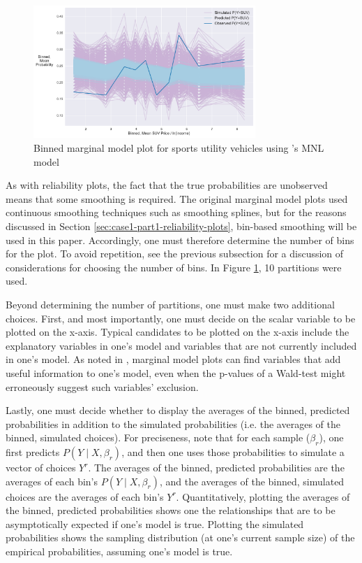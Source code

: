 \documentclass[preprint]{elsarticle}
\begin{document}
\begin{figure}
\centering
\includegraphics[width=0.75\textwidth]{marginal-model-plot-vehicle-choice-mnl-suv}
\caption{Binned marginal model plot for sports utility vehicles using \citeauthor{brownstone_forecasting_1998}'s MNL model}
\label{fig:orig-mnl-suv-marginal}
\end{figure}

As with reliability plots, the fact that the true probabilities are unobserved means that some smoothing is required. The original marginal model plots \citep{pardoe_2002_graphical} used continuous smoothing techniques such as smoothing splines, but for the reasons discussed in Section \ref{sec:case1-part1-reliability-plots}, bin-based smoothing will be used in this paper. Accordingly, one must therefore determine the number of bins for the plot. To avoid repetition, see the previous subsection for a discussion of considerations for choosing the number of bins. In Figure \ref{fig:orig-mnl-suv-marginal}, 10 partitions were used.

Beyond determining the number of partitions, one must make two additional choices. First, and most importantly, one must decide on the scalar variable to be plotted on the x-axis. Typical candidates to be plotted on the x-axis include the explanatory variables in one's model and variables that are not currently included in one's model. As noted in \citet{pardoe_2002_graphical}, marginal model plots can find variables that add useful information to one's model, even when the p-values of a Wald-test might erroneously suggest such variables' exclusion.

Lastly, one must decide whether to display the averages of the binned, predicted probabilities in addition to the simulated probabilities (i.e. the averages of the binned, simulated choices). For preciseness, note that for each sample ($\beta _r$), one first predicts $P \left( Y \mid X, \beta _r \right)$, and then one uses those probabilities to simulate a vector of choices $Y^r$. The averages of the binned, predicted probabilities are the averages of each bin's $P \left( Y \mid X, \beta_r \right)$, and the averages of the binned, simulated choices are the averages of each bin's $Y^r$. Quantitatively, plotting the averages of the binned, predicted probabilities shows one the relationships that are to be asymptotically expected if one's model is true. Plotting the simulated probabilities shows the sampling distribution (at one's current sample size) of the empirical probabilities, assuming one's model is true.
\end{document}
